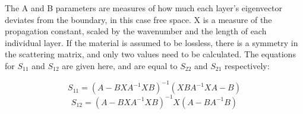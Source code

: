 The A and B parameters are measures of how much each layer’s eigenvector 
deviates from the boundary, in this case free space.  X is a measure of the 
propagation constant, scaled by the wavenumber and the length of each individual 
layer.  If the material is assumed to be lossless, there is a symmetry in the 
scattering matrix, and only two values need to be calculated.  The equations for 
$S_{11}$ and $S_{12}$ are given here, and are equal to $S_{22}$ and $S_{21}$ 
respectively:

\begin{equation}
  S_{11} = (A - BXA^{-1}XB)^{-1}(XBA^{-1}XA - B)
  \label{eq:15}
\end{equation}
\begin{equation}
  S_{12} = (A - BXA^{-1}XB)^{-1}X(A - BA^{-1}B)
  \label{eq:16}
  \end{equation}


